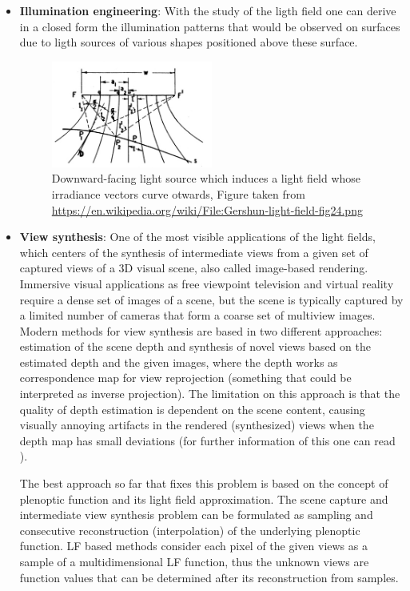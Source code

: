 \begin{itemize}
\item \textbf{Illumination engineering}: With the study of the ligth field one can derive in a closed form the illumination patterns that would be observed on surfaces due to ligth sources of various shapes positioned above these surface. 
\begin{figure}[h!]
\centering
\includegraphics[width= 0.50\textwidth]{./Diagrams/ill_enge.png}
\caption{Downward-facing light source which induces a light field whose irradiance vectors curve otwards, Figure taken from \url{https://en.wikipedia.org/wiki/File:Gershun-light-field-fig24.png}}
\end{figure}

\item \textbf{View synthesis}: One of the most visible applications of the light fields, which centers of the synthesis of intermediate views from a given set of captured views of a 3D visual scene, also called image-based rendering. Immersive visual applications as free viewpoint television and virtual reality require a dense set of images of a scene, but the scene is typically captured by a limited number of cameras that form a coarse set of multiview images. Modern methods for view synthesis are based in two different approaches: estimation of the scene depth and synthesis of novel views based on the estimated depth and the given images, where the depth works as correspondence map for view reprojection (something that could be interpreted as inverse projection). The limitation on this approach is that the quality of depth estimation is dependent on the scene content, causing visually annoying artifacts in the rendered (synthesized) views when the depth map has small deviations (for further information of this one can read \cite{Kim-Zimmer}).

\bigskip

The best approach so far that fixes this problem is based on the concept of plenoptic function and its light field  approximation. The scene capture and intermediate view synthesis problem can be formulated as sampling and consecutive reconstruction (interpolation) of the underlying plenoptic function. LF based methods consider each pixel of the given views as a sample of a multidimensional LF function, thus the unknown views are function values that can be determined after its reconstruction from samples.


\end{itemize}
